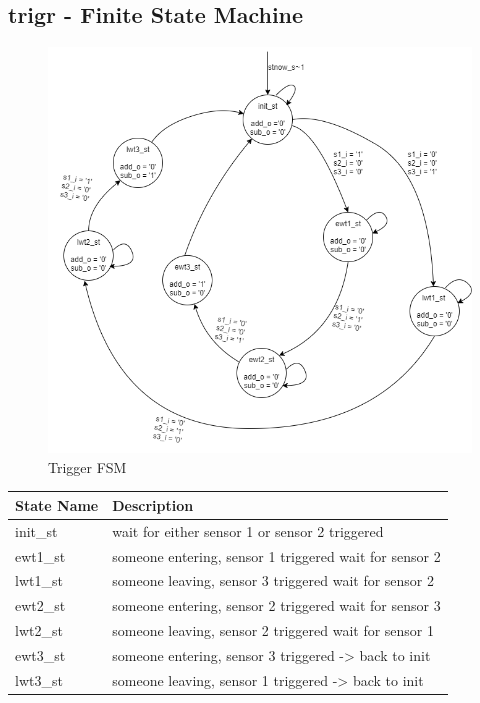 \documentclass[12pt,a4 paper] {report}
\begin{document}
\subsection*{trigr - Finite State Machine}
\begin{figure}[h]
	\centering	
	\includegraphics[scale=0.4]{../png/trigger.png}
	\caption{Trigger FSM}
\end{figure}
\begin{center}
 \begin{tabular}{| p{4cm} | p{7cm} |}
	 \hline
	 \textbf{State Name} & \textbf{Description} \\
	 \hline
	 init\_st & wait for either sensor 1 or sensor 2 triggered \\
	 \hline
	 ewt1\_st & someone entering, sensor 1 triggered wait for sensor 2 \\
	 \hline
	 lwt1\_st & someone leaving, sensor 3 triggered wait for sensor 2 \\
	 \hline
	 ewt2\_st & someone entering, sensor 2 triggered wait for sensor 3 \\
	 \hline
	 lwt2\_st & someone leaving, sensor 2 triggered wait for sensor 1 \\
	 \hline
	 ewt3\_st & someone entering, sensor 3 triggered -> back to init \\
	 \hline
	 lwt3\_st & someone leaving, sensor 1 triggered -> back to init \\
	 \hline
 \end{tabular}
\end{center}
\end{document}
